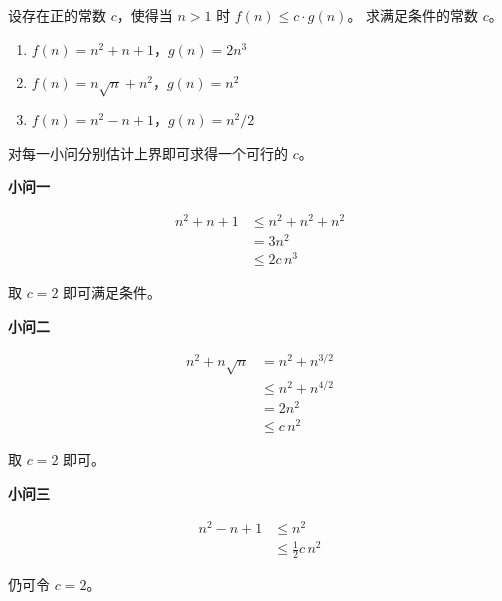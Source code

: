 \documentclass{homework}
\begin{document}
\maketitle

\pagebreak

\begin{homeworkProblem}
    设存在正的常数 \(c\)，使得当 \(n>1\) 时 \(f(n) \leq c\cdot g(n)\)。
    求满足条件的常数 \(c\)。

    \begin{enumerate}
        \item \(f(n) = n^2 + n + 1\)，\(g(n) = 2n^3\)
        \item \(f(n) = n\sqrt{n} + n^2\)，\(g(n) = n^2\)
        \item \(f(n) = n^2 - n + 1\)，\(g(n) = n^2 / 2\)
    \end{enumerate}

    \solution

    对每一小问分别估计上界即可求得一个可行的 \(c\)。

    \textbf{小问一}

    \[
        \begin{split}
            n^2 + n + 1
            &\leq n^2 + n^2 + n^2\\
            &= 3n^2\\
            &\leq 2c\, n^3
        \end{split}
    \]

    取 \(c = 2\) 即可满足条件。

    \textbf{小问二}

    \[
        \begin{split}
            n^2 + n\sqrt{n}
            &= n^2 + n^{3/2}\\
            &\leq n^2 + n^{4/2}\\
            &= 2n^2\\
            &\leq c\, n^2
        \end{split}
    \]

    取 \(c = 2\) 即可。

    \textbf{小问三}

    \[
        \begin{split}
            n^2 - n + 1
            &\leq n^2\\
            &\leq \tfrac{1}{2}c\, n^2
        \end{split}
    \]

    仍可令 \(c = 2\)。
\end{homeworkProblem}
\end{document}
